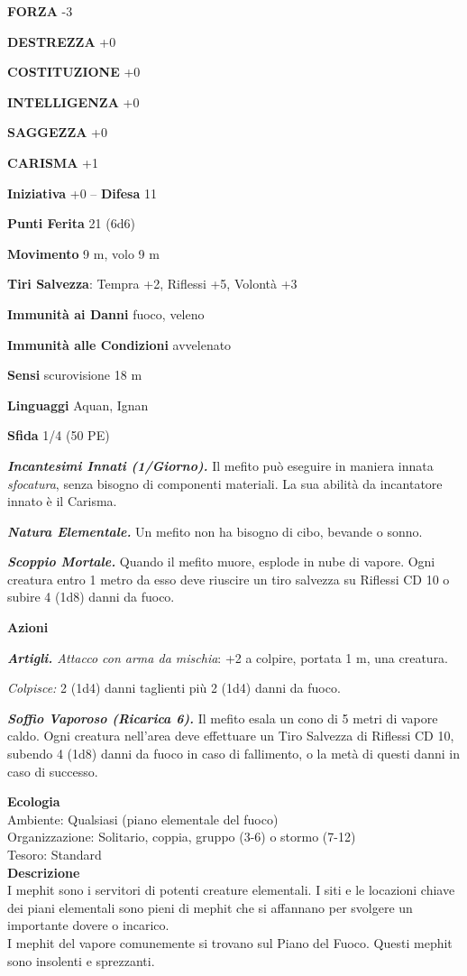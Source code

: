 \begin{multicols}{2}
\textbf{FORZA} -3

\textbf{DESTREZZA} +0

\textbf{COSTITUZIONE} +0

\textbf{INTELLIGENZA} +0

\textbf{SAGGEZZA} +0

\textbf{CARISMA} +1

\textbf{Iniziativa} +0 -- \textbf{Difesa} 11

\textbf{Punti Ferita} 21 (6d6)

\textbf{Movimento} 9 m, volo 9 m

\textbf{Tiri Salvezza}: Tempra +2, Riflessi +5, Volontà +3

\textbf{Immunità ai Danni} fuoco, veleno

\textbf{Immunità alle Condizioni} avvelenato

\textbf{Sensi} scurovisione 18 m

\textbf{Linguaggi} Aquan, Ignan

\textbf{Sfida} 1/4 (50 PE)

\emph{\textbf{Incantesimi Innati (1/Giorno).}} Il mefito può eseguire in
maniera innata \emph{sfocatura}, senza bisogno di componenti materiali.
La sua abilità da incantatore innato è il Carisma.

\emph{\textbf{Natura Elementale.}} Un mefito non ha bisogno di cibo,
bevande o sonno.

\emph{\textbf{Scoppio Mortale.}} Quando il mefito muore, esplode in nube
di vapore. Ogni creatura entro 1 metro da esso deve riuscire un tiro
salvezza su Riflessi CD 10 o subire 4 (1d8) danni da fuoco.

\textbf{Azioni}

\emph{\textbf{Artigli.} Attacco con arma da mischia}: +2 a colpire,
portata 1 m, una creatura.

\emph{Colpisce:} 2 (1d4) danni taglienti più 2 (1d4) danni da fuoco.

\emph{\textbf{Soffio Vaporoso (Ricarica 6).}} Il mefito esala un cono di 5 metri di vapore caldo. Ogni creatura nell'area deve effettuare un Tiro Salvezza di Riflessi CD 10, subendo 4 (1d8) danni da fuoco in caso di fallimento, o la metà di questi danni in caso di successo.

\textbf{Ecologia}\\
Ambiente: Qualsiasi (piano elementale del fuoco)\\
Organizzazione: Solitario, coppia, gruppo (3-6) o stormo (7-12)\\
Tesoro: Standard\\
\textbf{Descrizione}\\
I mephit sono i servitori di potenti creature elementali. I siti e le locazioni chiave dei piani elementali sono pieni di mephit che si affannano per svolgere un importante dovere o incarico.\\
I mephit del vapore comunemente si trovano sul Piano del Fuoco. Questi mephit sono insolenti e sprezzanti.\\




\end{multicols}
